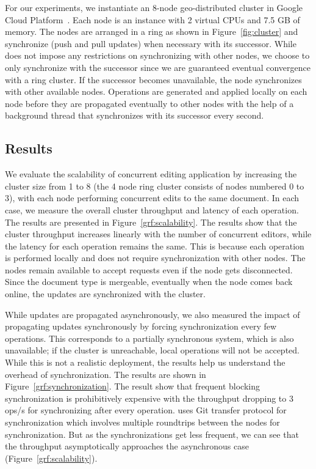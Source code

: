 For our experiments, we instantiate an 8-node geo-distributed cluster in Google
Cloud Platform~\cite{gcp}. Each node is an  instance with 2
virtual CPUs and 7.5 GB of memory. The nodes are arranged in a ring as shown in
Figure~\ref{fig:cluster} and synchronize (push and pull updates) when necessary
with its successor. While \name does not impose any restrictions on
synchronizing with other nodes, we choose to only synchronize with the
successor since we are guaranteed eventual convergence with a ring cluster. If
the successor becomes unavailable, the node synchronizes with other available
nodes. Operations are generated and applied locally on each node before they
are propagated eventually to other nodes with the help of a background thread
that synchronizes with its successor every second.

\subsection{Results}

We evaluate the scalability of concurrent editing application by increasing the
cluster size from 1 to 8 (the 4 node ring cluster consists of nodes numbered 0
to 3), with each node performing concurrent edits to the same document. In each
case, we measure the overall cluster throughput and latency of each operation.
The results are presented in Figure~\ref{grf:scalability}. The results show
that the cluster throughput increases linearly with the number of concurrent
editors, while the latency for each operation remains the same. This is because
each operation is performed locally and does not require synchronization with
other nodes. The nodes remain available to accept requests even if the node
gets disconnected. Since the document type is mergeable, eventually when the
node comes back online, the updates are synchronized with the cluster.

While updates are propagated asynchronously, we also measured the impact of
propagating updates synchronously by forcing synchronization every few
operations. This corresponds to a partially synchronous system, which is also
unavailable; if the cluster is unreachable, local operations will not be
accepted. While this is not a realistic deployment, the results help us
understand the overhead of synchronization. The results are shown in
Figure~\ref{grf:synchronization}. The result show that frequent blocking
synchronization is prohibitively expensive with the throughput dropping to 3
ops/s for synchronizing after every operation. \name uses Git transfer protocol
for synchronization which involves multiple roundtrips between the nodes for
synchronization. But as the synchronizations get less frequent, we can see that
the throughput asymptotically approaches the asynchronous case
(Figure~\ref{grf:scalability}).

